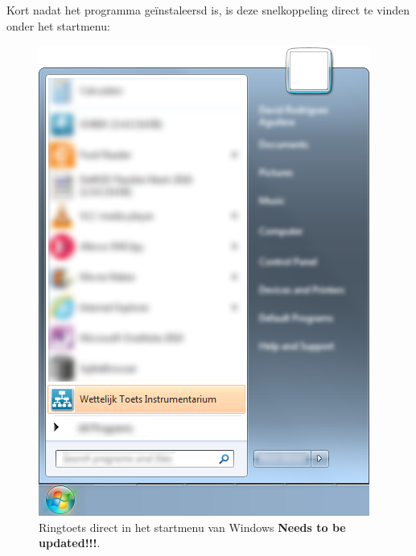 Kort nadat het programma ge\"instaleersd is, is deze snelkoppeling direct te vinden onder het startmenu:


\begin{figure} [H]
	\centering
		\includegraphics{figures/chapter_installation/rtDirectlyinStartMenu}
	\caption{Ringtoets direct in het startmenu van Windows \color[rgb]{1,0,0} \textbf{Needs to be updated!!!}\color[rgb]{0,0,0}.}
	\label{fig:fig2.3}
\end{figure}













